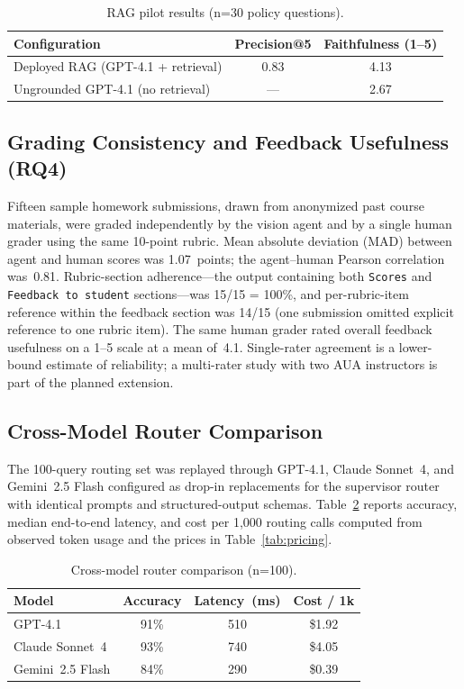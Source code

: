 \documentclass[conference]{IEEEtran}
\begin{document}
\begin{table}[h]
\centering
\caption{RAG pilot results (n=30 policy questions).}
\label{tab:rag}
\begin{tabular}{lcc}
\toprule
Configuration & Precision@5 & Faithfulness (1--5) \\
\midrule
Deployed RAG (GPT-4.1 + retrieval) & 0.83 & 4.13 \\
Ungrounded GPT-4.1 (no retrieval)  & ---  & 2.67 \\
\bottomrule
\end{tabular}
\end{table}

\subsection{Grading Consistency and Feedback Usefulness (RQ4)}

Fifteen sample homework submissions, drawn from anonymized past course materials, were graded independently by the vision agent and by a single human grader using the same 10-point rubric. Mean absolute deviation (MAD) between agent and human scores was 1.07~points; the agent--human Pearson correlation was~0.81. Rubric-section adherence---the output containing both \texttt{Scores} and \texttt{Feedback to student} sections---was 15/15 = 100\%, and per-rubric-item reference within the feedback section was 14/15 (one submission omitted explicit reference to one rubric item). The same human grader rated overall feedback usefulness on a 1--5 scale at a mean of~4.1. Single-rater agreement is a lower-bound estimate of reliability; a multi-rater study with two AUA instructors is part of the planned extension.

\subsection{Cross-Model Router Comparison}

The 100-query routing set was replayed through GPT-4.1, Claude Sonnet~4, and Gemini~2.5 Flash configured as drop-in replacements for the supervisor router with identical prompts and structured-output schemas. Table~\ref{tab:crossmodel} reports accuracy, median end-to-end latency, and cost per 1{,}000 routing calls computed from observed token usage and the prices in Table~\ref{tab:pricing}.

\begin{table}[h]
\centering
\caption{Cross-model router comparison (n=100).}
\label{tab:crossmodel}
\begin{tabular}{lccc}
\toprule
Model & Accuracy & Latency~(ms) & Cost / 1k \\
\midrule
GPT-4.1            & 91\% & 510 & \$1.92 \\
Claude Sonnet~4    & 93\% & 740 & \$4.05 \\
Gemini~2.5 Flash   & 84\% & 290 & \$0.39 \\
\bottomrule
\end{tabular}
\end{table}
\end{document}
